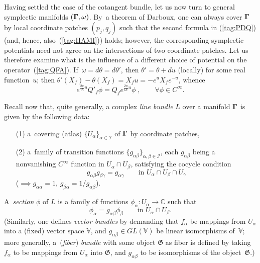 \documentclass[11pt]{amsart}
\numberwithin{equation}{section}
\theoremstyle{remark}
\let\Bbb\mathbb \let\Cal\mathcal \let\frak\mathfrak
\newcommand\Omg{{\bigam}}   %
\newcommand{\CC}{\C}
\newcommand{\bigam}{\mbox{\boldmath $\Gamma$}}
\newcommand{\C}{\mathbb C}
\begin{document}
Having settled the case of the cotangent bundle, let us now turn to general
symplectic manifolds $(\Omg,\omega)$. By~a theorem of Darboux, one can always
cover $\Omg$ by local coordinate patches $(p_j,q_j)$ such that the second
formula in (\ref{tag:PDQ}) (and, hence, also~(\ref{tag:HAMI})) holds; however,
the corresponding symplectic potentials need not agree on the intersections of
two coordinate patches. Let us therefore examine what is the influence of a
different choice of potential on the operator~(\ref{tag:QFA}).
If~$\omega=d\theta=d\theta'$, then $\theta'=\theta+du$ (locally) for some real
function~$u$; then $\theta'(X_f)- \theta(X_f)=X_f u=-e^u X_f e^{-u}$, whence
\begin{equation}  e^{\frac{2\pi}{ih}u} Q'_f \phi = Q_f e^{\frac{2\pi}{ih}u}
\phi\; , \qquad \forall \phi\in C^\infty. \label{tag:QFB}  \end{equation}

Recall now that, quite generally, a complex {\sl line bundle\/} $L$ over a
manifold $\Omg$ is given by the following data:
\begin{enumerate}
\item[(1)] a~covering (atlas) $\{U_\alpha\}_{\alpha\in\Cal I}$ of $\Omg$ by
coordinate patches,
\item[(2)] a~family of transition functions $\{g_{\alpha\beta}\}_{\alpha,\beta
\in\Cal I}$, each $g_{\alpha\beta}$ being a nonvanishing $C^\infty$ function in
$U_\alpha\cap U_\beta$, satisfying the cocycle condition
\begin{equation}  g_{\alpha\beta} g_{\beta\gamma} = g_{\alpha\gamma}
\qquad\text{in } U_\alpha\cap U_\beta\cap U_\gamma  \label{tag:QFC}
\end{equation}
(${}\implies g_{\alpha\alpha}=1$, $g_{\beta\alpha}=1/g_{\alpha\beta}$).
\end{enumerate}
A~{\sl section\/} $\phi$ of $L$ is a family of functions $\phi_\alpha:U_\alpha
\to\CC$ such that
\begin{equation}  \phi_\alpha = g_{\alpha\beta} \phi_\beta \qquad
\text{in } U_\alpha\cap U_\beta.   \label{tag:QFD}  \end{equation}
(Similarly, one defines {\sl vector bundles\/} by demanding that $f_\alpha$ be
mappings from $U_\alpha$ into a (fixed) vector space $\Bbb V$, and $g_{\alpha
\beta}\in GL(\Bbb V)$ be linear isomorphisms of~$\Bbb V$; more generally,
a~({\sl fiber\/}) {\sl bundle\/} with some object $\frak G$ as fiber is defined
by taking $f_\alpha$ to be mappings from $U_\alpha$ into $\frak G$, and
$g_{\alpha\beta}$ to be isomorphisms of the object~$\frak G$.)
\end{document}
